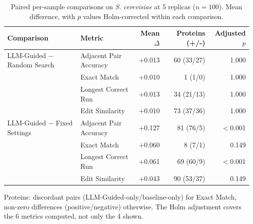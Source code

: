 \begin{table}[!tb]
  \centering
  \caption{Paired per-sample comparisons on \textnormal{\textnormal{\textit{S. cerevisiae}}} at 5 replicas ($n=100$). Mean difference, with $p$ values Holm-corrected within each comparison.}
  \label{tab:paired_tests_yeast_r5}
  \begin{tabular}{llrrr}
    \toprule
    Comparison & Metric & Mean $\Delta$ & Proteins (+/-) & Adjusted $p$ \\
    \midrule
    LLM-Guided $-$ Random Search & Adjacent Pair Accuracy & +0.013 & 60 (33/27) & 1.000 \\
     & Exact Match & +0.010 & 1 (1/0) & 1.000 \\
     & Longest Correct Run & +0.013 & 34 (21/13) & 1.000 \\
     & Edit Similarity & +0.010 & 73 (37/36) & 1.000 \\
    \midrule
    LLM-Guided $-$ Fixed Settings & Adjacent Pair Accuracy & +0.127 & 81 (76/5) & $<$0.001 \\
     & Exact Match & +0.060 & 8 (7/1) & 0.149 \\
     & Longest Correct Run & +0.061 & 69 (60/9) & $<$0.001 \\
     & Edit Similarity & +0.043 & 90 (53/37) & 0.149 \\
    \bottomrule
  \end{tabular}
  \par\smallskip\footnotesize{Proteins: discordant pairs (LLM-Guided-only/baseline-only) for Exact Match, non-zero differences (positive/negative) otherwise. The Holm adjustment covers the 6 metrics computed, not only the 4 shown.}
\end{table}
